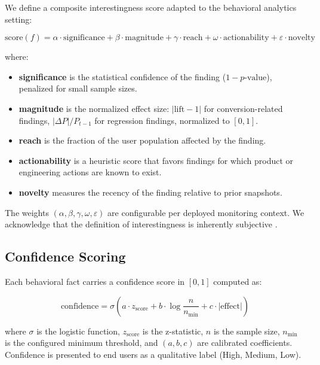 \documentclass[12pt, a4paper]{article}
\begin{document}
We define a composite interestingness score adapted to the behavioral analytics setting:

\begin{equation}
  \text{score}(f) = \alpha \cdot \text{significance} + \beta \cdot \text{magnitude} + \gamma \cdot \text{reach} + \omega \cdot \text{actionability} + \varepsilon \cdot \text{novelty}
  \label{eq:score}
\end{equation}

where:
\begin{itemize}[leftmargin=1.5em]
  \item \textbf{significance} is the statistical confidence of the finding ($1 - p\text{-value}$), penalized for small sample sizes.
  \item \textbf{magnitude} is the normalized effect size: $|\text{lift} - 1|$ for conversion-related findings, $|\Delta P| / P_{t-1}$ for regression findings, normalized to $[0, 1]$.
  \item \textbf{reach} is the fraction of the user population affected by the finding.
  \item \textbf{actionability} is a heuristic score that favors findings for which product or engineering actions are known to exist.
  \item \textbf{novelty} measures the recency of the finding relative to prior snapshots.
\end{itemize}

The weights $(\alpha, \beta, \gamma, \omega, \varepsilon)$ are configurable per deployed monitoring context. We acknowledge that the definition of interestingness is inherently subjective \cite{silberschatz1995}.

\subsection{Confidence Scoring}

Each behavioral fact carries a confidence score in $[0, 1]$ computed as:

\begin{equation}
  \text{confidence} = \sigma\!\left(a \cdot z_{\text{score}} + b \cdot \log\frac{n}{n_{\min}} + c \cdot |\text{effect}|\right)
  \label{eq:confidence}
\end{equation}

where $\sigma$ is the logistic function, $z_{\text{score}}$ is the z-statistic, $n$ is the sample size, $n_{\min}$ is the configured minimum threshold, and $(a, b, c)$ are calibrated coefficients. Confidence is presented to end users as a qualitative label (High, Medium, Low).
\end{document}
